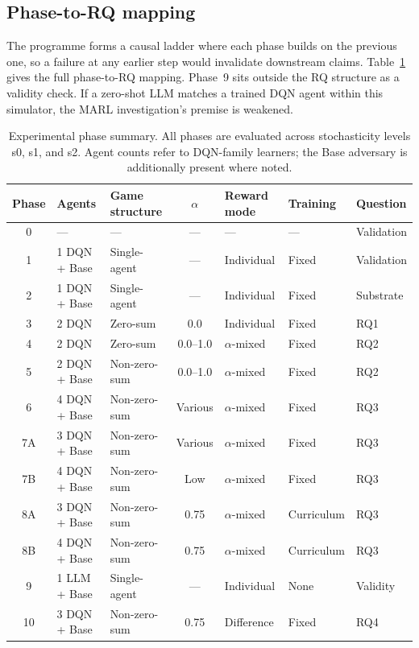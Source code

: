 \subsection{Phase-to-RQ mapping}
\label{sec:phase-rq-mapping}

The programme forms a causal ladder where each phase builds on the previous one, so a failure at any earlier step would invalidate downstream claims. Table~\ref{tab:phases} gives the full phase-to-RQ mapping. Phase~9 sits outside the RQ structure as a validity check. If a zero-shot LLM matches a trained DQN agent within this simulator, the MARL investigation's premise is weakened.

\begin{table}[htbp]
\centering
\small
\caption{Experimental phase summary. All phases are evaluated across stochasticity levels s0, s1, and s2. Agent counts refer to DQN-family learners; the Base adversary is additionally present where noted.}
\label{tab:phases}
\begin{tabular}{|c|l|l|c|l|l|l|}
\hline
\textbf{Phase} & \textbf{Agents} & \textbf{Game structure} & \textbf{$\alpha$} & \textbf{Reward mode} & \textbf{Training} & \textbf{Question} \\
\hline
0   & ---                & ---           & ---      & ---              & ---        & Validation \\
1   & 1 DQN + Base       & Single-agent  & ---      & Individual       & Fixed      & Validation \\
2   & 1 DQN + Base       & Single-agent  & ---      & Individual       & Fixed      & Substrate \\
3   & 2 DQN              & Zero-sum      & 0.0      & Individual       & Fixed      & RQ1 \\
4   & 2 DQN              & Zero-sum      & 0.0--1.0 & $\alpha$-mixed      & Fixed      & RQ2 \\
5   & 2 DQN + Base       & Non-zero-sum  & 0.0--1.0 & $\alpha$-mixed      & Fixed      & RQ2 \\
6   & 4 DQN + Base       & Non-zero-sum  & Various  & $\alpha$-mixed      & Fixed      & RQ3 \\
7A  & 3 DQN + Base       & Non-zero-sum  & Various  & $\alpha$-mixed      & Fixed      & RQ3 \\
7B  & 4 DQN + Base       & Non-zero-sum  & Low      & $\alpha$-mixed      & Fixed      & RQ3 \\
8A  & 3 DQN + Base       & Non-zero-sum  & 0.75     & $\alpha$-mixed      & Curriculum & RQ3 \\
8B  & 4 DQN + Base       & Non-zero-sum  & 0.75     & $\alpha$-mixed      & Curriculum & RQ3 \\
9   & 1 LLM + Base       & Single-agent  & ---      & Individual       & None       & Validity \\
10  & 3 DQN + Base       & Non-zero-sum  & 0.75     & Difference       & Fixed      & RQ4 \\
\hline
\end{tabular}
\end{table}

